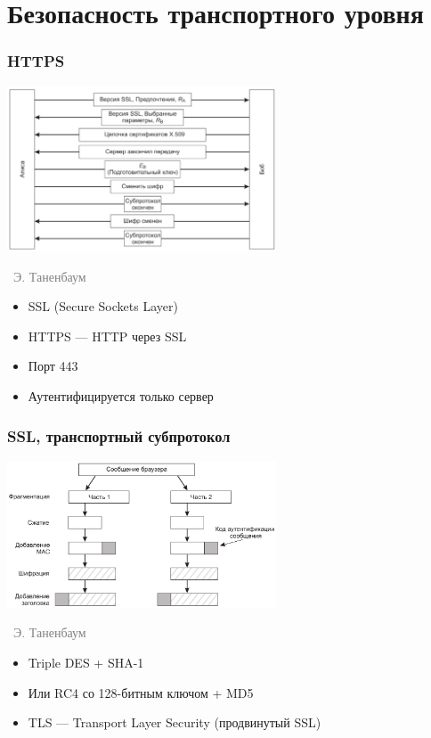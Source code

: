 \documentclass[xetex,mathserif,serif]{beamer}
\newcommand{\attribution}[1] {
\vspace{-5mm}\begin{flushright}\begin{scriptsize}\textcolor{gray}{\textcopyright\, #1}\end{scriptsize}\end{flushright}
}
\begin{document}
    \section{Безопасность транспортного уровня}

    \begin{frame}
        \frametitle{HTTPS}
        \begin{center}
            \includegraphics[width=0.6\textwidth]{ssl.png}
            \attribution{Э. Таненбаум}
        \end{center}
        \begin{itemize}
            \item SSL (Secure Sockets Layer)
            \item HTTPS --- HTTP через SSL
            \item Порт 443
            \item Аутентифицируется только сервер
        \end{itemize}
    \end{frame}

    \begin{frame}
        \frametitle{SSL, транспортный субпротокол}
        \begin{center}
            \includegraphics[width=0.6\textwidth]{sslCommunication.png}
            \attribution{Э. Таненбаум}
        \end{center}
        \begin{itemize}
            \item Triple DES + SHA-1
            \item Или RC4 со 128-битным ключом + MD5
            \item TLS --- Transport Layer Security (продвинутый SSL)
        \end{itemize}
    \end{frame}
\end{document}
